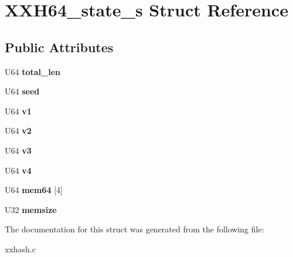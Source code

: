 \hypertarget{structXXH64__state__s}{}\section{X\+X\+H64\+\_\+state\+\_\+s Struct Reference}
\label{structXXH64__state__s}
\subsection*{Public Attributes}
\begin{DoxyCompactItemize}
\item 
\hypertarget{structXXH64__state__s_a70a4216849fb4f5edf62c6a64d09f7cd}{}U64 {\bfseries total\+\_\+len}\label{structXXH64__state__s_a70a4216849fb4f5edf62c6a64d09f7cd}

\item 
\hypertarget{structXXH64__state__s_a9045982ec37670d2ad245566ebd10d56}{}U64 {\bfseries seed}\label{structXXH64__state__s_a9045982ec37670d2ad245566ebd10d56}

\item 
\hypertarget{structXXH64__state__s_ad32a0f560e6a6c33729f1a74843ca61f}{}U64 {\bfseries v1}\label{structXXH64__state__s_ad32a0f560e6a6c33729f1a74843ca61f}

\item 
\hypertarget{structXXH64__state__s_a2c1819a0ff63d6bff52d3ab5d8145550}{}U64 {\bfseries v2}\label{structXXH64__state__s_a2c1819a0ff63d6bff52d3ab5d8145550}

\item 
\hypertarget{structXXH64__state__s_a64a012b78012a6ad5601e476f5b120cb}{}U64 {\bfseries v3}\label{structXXH64__state__s_a64a012b78012a6ad5601e476f5b120cb}

\item 
\hypertarget{structXXH64__state__s_add69468ad79134aeb4c09d80544773f8}{}U64 {\bfseries v4}\label{structXXH64__state__s_add69468ad79134aeb4c09d80544773f8}

\item 
\hypertarget{structXXH64__state__s_a9497bd912ce5cd6471ee3d1a21464c7c}{}U64 {\bfseries mem64} \mbox{[}4\mbox{]}\label{structXXH64__state__s_a9497bd912ce5cd6471ee3d1a21464c7c}

\item 
\hypertarget{structXXH64__state__s_ad7b3cd4ccd11356ea93f3df41475b980}{}U32 {\bfseries memsize}\label{structXXH64__state__s_ad7b3cd4ccd11356ea93f3df41475b980}

\end{DoxyCompactItemize}


The documentation for this struct was generated from the following file\+:\begin{DoxyCompactItemize}
\item 
xxhash.\+c\end{DoxyCompactItemize}
